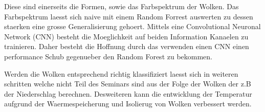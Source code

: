 Diese sind einerseits die Formen, sowie das Farbspektrum der Wolken.
Das Farbspektrum laesst sich naive mit einem Random Forrest auswerten zu dessen
staerken eine grosse Generalisierung gehoert. 
Mittels eine Convolutional Neuronal Network (CNN) besteht die Moeglichkeit auf
beiden Information Kanaelen zu trainieren. 
Daher besteht die Hoffnung durch das verwenden einen CNN einen performance Schub
gegenueber den Random Forest zu bekommen. \par
Werden die Wolken entsprechend richtig klassifiziert laesst sich in weiteren
schritten welche nicht Teil des Seminars sind aus der Folge der Wolken der z.B
der Niederschlag berechnen. 
Desweiteren kann die entwicklung der Temperatur aufgrund der Waermespeicherung
und Isolierug von Wolken verbessert werden.

